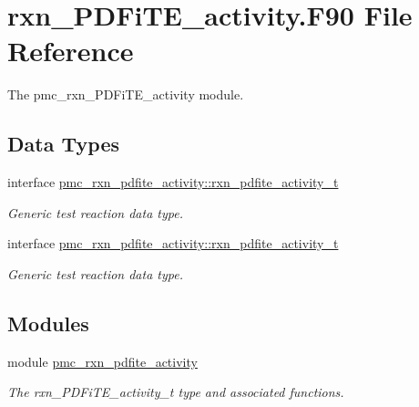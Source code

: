 \hypertarget{rxn___p_d_fi_t_e__activity_8_f90}{}\section{rxn\+\_\+\+P\+D\+Fi\+T\+E\+\_\+activity.\+F90 File Reference}
\label{rxn___p_d_fi_t_e__activity_8_f90}


The pmc\+\_\+rxn\+\_\+\+P\+D\+Fi\+T\+E\+\_\+activity module.  


\subsection*{Data Types}
\begin{DoxyCompactItemize}
\item 
interface \mbox{\hyperlink{structpmc__rxn__pdfite__activity_1_1rxn__pdfite__activity__t}{pmc\+\_\+rxn\+\_\+pdfite\+\_\+activity\+::rxn\+\_\+pdfite\+\_\+activity\+\_\+t}}
\begin{DoxyCompactList}\small\item\em Generic test reaction data type. \end{DoxyCompactList}\item 
interface \mbox{\hyperlink{structpmc__rxn__pdfite__activity_1_1rxn__pdfite__activity__t}{pmc\+\_\+rxn\+\_\+pdfite\+\_\+activity\+::rxn\+\_\+pdfite\+\_\+activity\+\_\+t}}
\begin{DoxyCompactList}\small\item\em Generic test reaction data type. \end{DoxyCompactList}\end{DoxyCompactItemize}
\subsection*{Modules}
\begin{DoxyCompactItemize}
\item 
module \mbox{\hyperlink{namespacepmc__rxn__pdfite__activity}{pmc\+\_\+rxn\+\_\+pdfite\+\_\+activity}}
\begin{DoxyCompactList}\small\item\em The rxn\+\_\+\+P\+D\+Fi\+T\+E\+\_\+activity\+\_\+t type and associated functions. \end{DoxyCompactList}\end{DoxyCompactItemize}

